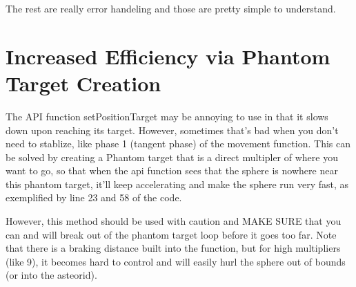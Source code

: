 \documentclass [12 pt, twoside] {article}
\begin{document}
The rest are really error handeling and those are pretty simple to understand.


\section{Increased Efficiency via Phantom Target Creation}


\indent The API function setPositionTarget may be annoying to use in that it slows down upon
reaching its target. However, sometimes that's bad when you don't need to stablize, like
phase 1 (tangent phase) of the movement function. This can be solved by creating a Phantom
target that is a direct multipler of where you want to go, so that when the api function
sees that the sphere is nowhere near this phantom target, it'll keep accelerating and make
the sphere run very fast, as exemplified by line 23 and 58 of the code.


However, this method should be used with caution and MAKE SURE that you can and will break
out of the phantom target loop before it goes too far. Note that there is a braking distance
built into the function, but for high multipliers (like 9), it becomes hard to control
and will easily hurl the sphere out of bounds (or into the asteorid).
\end{document}
